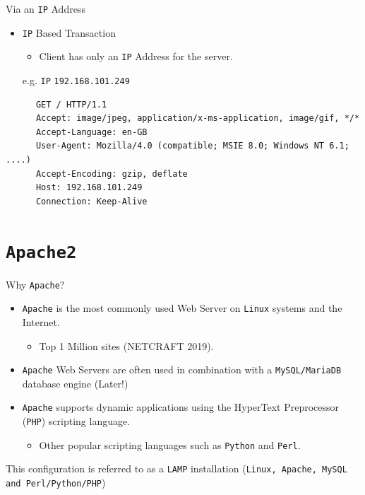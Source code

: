 \documentclass[xcolor=table]{beamer}
\begin{document}
\begin{frame}[fragile]{Via an \texttt{IP} Address}
  \begin{itemize}
      \item \texttt{IP} Based Transaction
        \begin{itemize}
          \item Client has only an \texttt{IP} Address for the server.
        \end{itemize}
      \begin{center}
        e.g. \texttt{IP} \texttt{192.168.101.249}        
      \end{center}
    \end{itemize}
  \begin{tcolorbox}
    \lstset{
      basicstyle=\tiny\ttfamily,
    }
    \begin{lstlisting}
      GET / HTTP/1.1
      Accept: image/jpeg, application/x-ms-application, image/gif, */*
      Accept-Language: en-GB
      User-Agent: Mozilla/4.0 (compatible; MSIE 8.0; Windows NT 6.1; ....)
      Accept-Encoding: gzip, deflate
      Host: 192.168.101.249
      Connection: Keep-Alive
    \end{lstlisting}
  \end{tcolorbox}
\end{frame}

\section{\texttt{Apache2}}
\begin{frame}{Why \texttt{Apache}?}
  \begin{itemize}
    \item \texttt{Apache} is the most commonly used Web Server on \texttt{Linux} systems and the Internet.
      \begin{itemize}
        \item Top 1 Million sites (NETCRAFT 2019).
      \end{itemize}
    \item \texttt{Apache} Web Servers are often used in combination with a \texttt{MySQL/MariaDB} database engine (Later!)
    \item \texttt{Apache} supports dynamic applications using the HyperText Preprocessor (\texttt{PHP}) scripting language. 
      \begin{itemize}
        \item Other popular scripting languages such as \texttt{Python} and \texttt{Perl}.
      \end{itemize}
  \end{itemize}
  \begin{tcolorbox}
    \begin{center}
      \scriptsize This configuration is referred to as a \texttt{LAMP} installation (\texttt{Linux, Apache, MySQL and Perl/Python/PHP})
    \end{center}
  \end{tcolorbox}
\end{frame}
\end{document}
